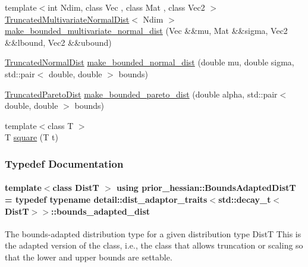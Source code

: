 \begin{DoxyCompactItemize}
\item 
{\footnotesize template$<$int Ndim, class Vec , class Mat , class Vec2 $>$ }\\\hyperlink{namespaceprior__hessian_a99ef03c8a3e476931d451d6d944ffae5}{Truncated\+Multivariate\+Normal\+Dist}$<$ Ndim $>$ \hyperlink{namespaceprior__hessian_a51a85cfe6ac613ed9b703e10280c1bbb}{make\+\_\+bounded\+\_\+multivariate\+\_\+normal\+\_\+dist} (Vec \&\&mu, Mat \&\&sigma, Vec2 \&\&lbound, Vec2 \&\&ubound)
\item 
\hyperlink{namespaceprior__hessian_a47f38d4bb5d31fd3f01f5eb6ba6f1223}{Truncated\+Normal\+Dist} \hyperlink{namespaceprior__hessian_a14ebf8db869f2c1e45781e41e69b3420}{make\+\_\+bounded\+\_\+normal\+\_\+dist} (double mu, double sigma, std\+::pair$<$ double, double $>$ bounds)
\item 
\hyperlink{namespaceprior__hessian_afebdccc7e1a35836f660f8a301af9cb2}{Truncated\+Pareto\+Dist} \hyperlink{namespaceprior__hessian_ae6d920b436127ce4698e75575581eed5}{make\+\_\+bounded\+\_\+pareto\+\_\+dist} (double alpha, std\+::pair$<$ double, double $>$ bounds)
\item 
{\footnotesize template$<$class T $>$ }\\T \hyperlink{namespaceprior__hessian_a706cb136b90f16dd920118eb59ef1ad6}{square} (T t)
\end{DoxyCompactItemize}


\subsubsection{Typedef Documentation}
\paragraph[{\texorpdfstring{Bounds\+Adapted\+DistT}{BoundsAdaptedDistT}}]{\setlength{\rightskip}{0pt plus 5cm}template$<$class DistT $>$ using {\bf prior\+\_\+hessian\+::\+Bounds\+Adapted\+DistT} = typedef typename {\bf detail\+::dist\+\_\+adaptor\+\_\+traits}$<$std\+::decay\+\_\+t$<$DistT$>$$>$\+::bounds\+\_\+adapted\+\_\+dist}\hypertarget{namespaceprior__hessian_a919f0d7f51ea845224ca7f03983508a9}{}\label{namespaceprior__hessian_a919f0d7f51ea845224ca7f03983508a9}
The bounds-\/adapted distribution type for a given distribution type DistT This is the adapted version of the class, i.\+e., the class that allows truncation or scaling so that the lower and upper bounds are settable. 

